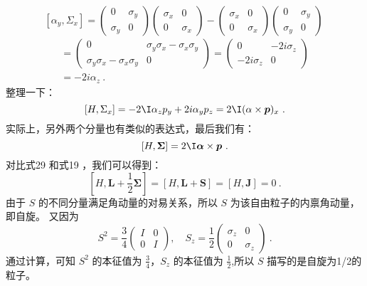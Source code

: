 \begin{equation}
\left[\alpha_{y}, \Sigma_{x}\right] = \left(\begin{array}{cc}
0 & \sigma_{y} \\
\sigma_{y} & 0
\end{array}\right)\left(\begin{array}{cc}
\sigma_{x} & 0 \\
0 & \sigma_{x}
\end{array}\right)-\left(\begin{array}{cc}
\sigma_{x} & 0 \\
0 & \sigma_{x}
\end{array}\right)\left(\begin{array}{cc}
0 & \sigma_{y} \\
\sigma_{y} & 0
\end{array}\right)~
\end{equation}
\begin{equation}
\begin{array}{l}
=\left(\begin{array}{cc}
0 & \sigma_{y} \sigma_{x}-\sigma_{x} \sigma_{y} \\
\sigma_{y} \sigma_{x}-\sigma_{x} \sigma_{y} & 0
\end{array}\right)=\left(\begin{array}{cc}
0 & -2 i \sigma_{z} \\
-2 i \sigma_{z} & 0
\end{array}\right) \\
=-2 i \alpha_{z}~.
\end{array}
\end{equation}
整理一下：
\begin{equation}
\left[H, \Sigma_{x}\right]=-2  \I \alpha_{z} p_{y}+2 i \alpha_{y} p_{z}=2  \I(\alpha \times \boldsymbol{p})_{x}~.
\end{equation}
实际上，另外两个分量也有类似的表达式，最后我们有：
\begin{equation}\label{eq_qed4_19}
[H, \mathbf{\Sigma}]=2  \I \boldsymbol{\alpha} \times \boldsymbol{p}~.
\end{equation}
对比式29 和式19 ，我们可以得到：
\begin{equation}
\left[H, \boldsymbol{L}+\frac{1}{2} \boldsymbol{\Sigma}\right]=[H, \boldsymbol{L}+\boldsymbol{S}]=[H, \boldsymbol{J}]=0~.
\end{equation}
由于 $S$ 的不同分量满足角动量的对易关系，所以 $S$ 为该自由粒子的内禀角动量，即自旋。
又因为
\begin{equation}
S^{2}=\frac{3}{4}\left(\begin{array}{ll}
I & 0 \\
0 & I
\end{array}\right), \quad S_{z}=\frac{1}{2}\left(\begin{array}{cc}
\sigma_{z} & 0 \\
0 & \sigma_{z}
\end{array}\right)~.
\end{equation}
通过计算，可知 $S^2$ 的本征值为 $\frac{3}{4}$，$S_{z}$ 的本征值为 $\frac{1}{2}$,所以 $S$ 描写的是自旋为1/2的粒子。

